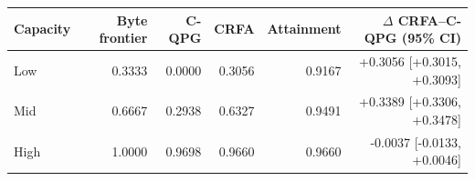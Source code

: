 \begin{tabular}{@{}lrrrrr@{}}
\toprule
Capacity & Byte frontier & C-QPG & CRFA & Attainment & $\Delta$ CRFA--C-QPG (95\% CI) \\
\midrule
Low & 0.3333 & 0.0000 & 0.3056 & 0.9167 & +0.3056 [+0.3015, +0.3093] \\
Mid & 0.6667 & 0.2938 & 0.6327 & 0.9491 & +0.3389 [+0.3306, +0.3478] \\
High & 1.0000 & 0.9698 & 0.9660 & 0.9660 & -0.0037 [-0.0133, +0.0046] \\
\bottomrule
\end{tabular}